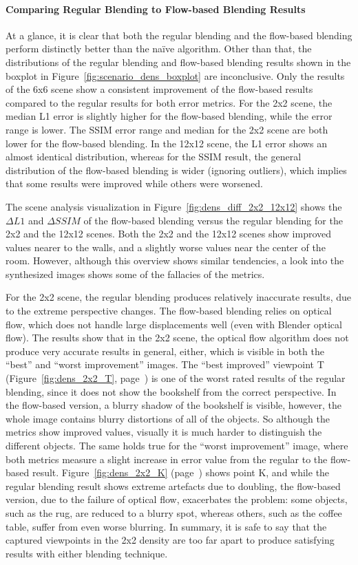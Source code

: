 \paragraph{Comparing Regular Blending to Flow-based Blending Results}
At a glance, it is clear that both the regular blending and the flow-based blending perform distinctly better than the na\"ive algorithm. Other than that, the distributions of the regular blending and flow-based blending results shown in the boxplot in Figure~\ref{fig:scenario_dens_boxplot} are inconclusive. Only the results of the 6x6 scene show a consistent improvement of the flow-based results compared to the regular results for both error metrics. For the 2x2 scene, the median L1 error is slightly higher for the flow-based blending, while the error range is lower. The SSIM error range and median for the 2x2 scene are both lower for the flow-based blending. In the 12x12 scene, the L1 error shows an almost identical distribution, whereas for the SSIM result, the general distribution of the flow-based blending is wider (ignoring outliers), which implies that some results were improved while others were worsened.

The scene analysis visualization in Figure~\ref{fig:dens_diff_2x2_12x12} shows the $\Delta L1$ and $\Delta SSIM$ of the flow-based blending versus the regular blending for the 2x2 and the 12x12 scenes. Both the 2x2 and the 12x12 scenes show improved values nearer to the walls, and a slightly worse values near the center of the room. However, although this overview shows similar tendencies, a look into the synthesized images shows some of the fallacies of the metrics. 

For the 2x2 scene, the regular blending produces relatively inaccurate results, due to the extreme perspective changes. The flow-based blending relies on optical flow, which does not handle large displacements well (even with Blender optical flow). The results show that in the 2x2 scene, the optical flow algorithm does not produce very accurate results in general, either, which is visible in both the ``best'' and ``worst improvement'' images.
The ``best improved'' viewpoint T (Figure~\ref{fig:dens_2x2_T}, page~\pageref{fig:dens_2x2_T}) is one of the worst rated results of the regular blending, since it does not show the bookshelf from the correct perspective. In the flow-based version, a blurry shadow of the bookshelf is visible, however, the whole image contains blurry distortions of all of the objects. So although the metrics show improved values, visually it is much harder to distinguish the different objects.
The same holds true for the ``worst improvement'' image, where both metrics measure a slight increase in error value from the regular to the flow-based result. Figure~\ref{fig:dens_2x2_K} (page~\pageref{fig:dens_2x2_K}) shows point K, and while the regular blending result shows extreme artefacts due to doubling, the flow-based version, due to the failure of optical flow, exacerbates the problem: some objects, such as the rug, are reduced to a blurry spot, whereas others, such as the coffee table, suffer from even worse blurring. In summary, it is safe to say that the captured viewpoints in the 2x2 density are too far apart to produce satisfying results with either blending technique.

